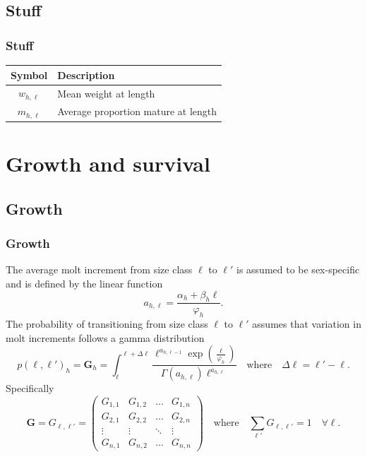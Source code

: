 \documentclass{beamer}
\begin{document}

\subsection{Stuff}
\begin{frame}
\frametitle{Stuff}

\begin{table}
  \centering
  \begin{tabular}{cl}
  \hline
  Symbol  & Description \\
  \hline
      $w_{h,\ell}$  & Mean weight at length\\
      $m_{h,\ell} $ & Average proportion mature at length\\
  \hline
  \end{tabular}
\end{table}

\end{frame}


\section{Growth and survival}
\subsection{Growth}

\begin{frame}
\frametitle{Growth}
The average molt increment from size class $\ell$ to $\ell'$ is assumed to be
sex-specific and is defined by the linear function
\begin{equation*}
  a_{h,\ell} = \frac{\alpha_h + \beta_h \ell}{\varphi_h}.
\end{equation*}
The probability of transitioning from size class $\ell$ to $\ell'$ assumes that
variation in molt increments follows a gamma distribution
\begin{equation*}
  p (\ell,\ell')_h = \boldsymbol{G}_h = \int^{\ell + \Delta \ell}_\ell \frac{\ell^{a_{h,\ell-1}} \exp
    \left(\frac{\ell}{\varphi_h} \right)}{\Gamma (a_{h,\ell}) \ell^{a_{h,\ell}}}
  \quad \text{where} \quad \Delta \ell = \ell' - \ell.
\end{equation*}
Specifically
\begin{equation*}
  \boldsymbol{G} = G_{\ell,\ell'} = \left( \begin{array}{cccc}
      G_{1,1} & G_{1,2} & \hdots & G_{1,n} \\
      G_{2,1} & G_{2,2} & \hdots & G_{2,n} \\
      \vdots & \vdots & \ddots & \vdots \\
      G_{n,1} & G_{n,2} & \hdots & G_{n,n} \end{array} \right)
  \quad \text{where} \quad \sum_{\ell'} G_{\ell,\ell'} = 1 \quad \forall \ell.
\end{equation*}
\end{frame}
\end{document}

